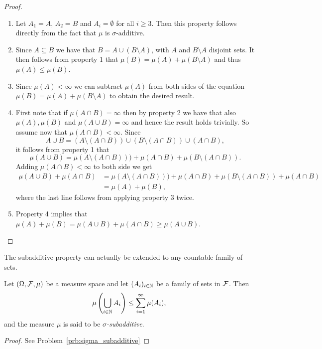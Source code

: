 \begin{proof}
\hfil
\begin{enumerate}
\item Let $A_1 = A$, $A_2 = B$ and $A_i = \emptyset$ for all $i \ge 3$. Then this property follows directly from the fact that $\mu$ is $\sigma$-additive.
\item Since $A \subseteq B$ we have that $B = A \cup (B \setminus A)$, with $A$ and $B \setminus A$ disjoint sets. It then follows from property 1 that $\mu(B) = \mu(A) + \mu(B \setminus A)$ and thus $\mu(A) \le \mu(B)$.
\item Since $\mu(A) < \infty$ we can subtract $\mu(A)$ from both sides of the equation $\mu(B) = \mu(A) + \mu(B \setminus A)$ to obtain the desired result.
\item First note that if $\mu(A \cap B) = \infty$ then by property 2 we have that also $\mu(A), \mu(B)$ and $\mu(A \cup B) = \infty$ and hence the result holds trivially. So assume now that $\mu(A \cap B) < \infty$. Since 
\[
	A \cup B = (A \setminus (A\cap B)) \cup (B \setminus (A \cap B)) \cup (A \cap B),
\] 
it follows from property 1 that
\[
	\mu(A \cup B) = \mu(A \setminus (A \cap B))) + \mu(A \cap B) + \mu(B \setminus (A \cap B)).
\] 
Adding $\mu(A \cap B) < \infty$ to both side we get
\begin{align*}
	\mu(A \cup B) + \mu(A \cap B) 
	&= \mu(A \setminus (A \cap B))) + \mu(A \cap B) + \mu(B \setminus (A \cap B)) + \mu(A \cap B)\\
	&= \mu(A) + \mu(B), 
\end{align*}
where the last line follows from applying property 3 twice.
\item Property 4 implies that $\mu(A) + \mu(B) = \mu(A \cup B) + \mu(A \cap B) \ge \mu(A \cup B)$.\qedhere
\end{enumerate}
\end{proof}

The subadditive property can actually be extended to any countable family of sets.

\begin{lemma}\label{lem:sigma_subadditive}
Let $(\Omega, \mathcal F, \mu)$ be a measure space and let $(A_i)_{i \in \mathbb N}$ be a family of sets in $\mathcal F$. Then
\[
	\mu\left(\bigcup_{i \in \mathbb N} A_i\right) \le \sum_{i = 1}^\infty \mu(A_i),
\]
and the measure $\mu$ is said to be \emph{$\sigma$-subadditive}.
\end{lemma}

\begin{proof}
See Problem~\ref{prb:sigma_subadditive}
\end{proof}

